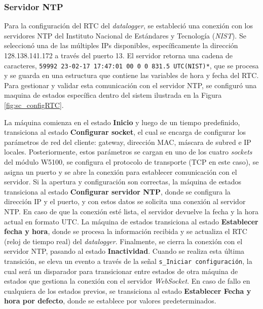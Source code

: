 \subsubsection{Servidor NTP}\label{sec:serverNTP}
Para la configuración del RTC del \textit{datalogger}, se estableció una conexión con los servidores NTP del Instituto Nacional de Estándares y Tecnología (\textit{NIST}). Se seleccionó una de las múltiples IPs disponibles, específicamente la dirección 128.138.141.172 a través del puerto 13. El servidor retorna una cadena de caracteres, \texttt{59992 23-02-17 17:47:01 00 0 0 831.5 UTC(NIST)*}, que se procesa y se guarda en una estructura que contiene las variables de hora y fecha del RTC. Para gestionar y validar esta comunicación con el servidor NTP, se configuró una maquina de estados específica dentro del sistem ilustrada en la Figura \ref{fig:sc_configRTC}.




La máquina comienza en el estado \textbf{Inicio} y luego de un tiempo predefinido, transiciona al estado \textbf{Configurar socket}, el cual se encarga de configurar los parámetros de red del cliente: gateway, dirección MAC, máscara de subred e IP locales. Posteriormente, estos parámetros se cargan en uno de los cuatro \textit{sockets} del módulo W5100, se configura el protocolo de transporte (TCP en este caso), se asigna un puerto y se abre la conexión para establecer comunicación con el servidor. Si la apertura y configuración son correctas, la máquina de estados transiciona al estado \textbf{Configurar servidor NTP}, donde se configura la dirección IP y el puerto, y con estos datos se solicita una conexión al servidor NTP. En caso de que la conexión esté lista, el servidor devuelve la fecha y la hora actual en formato UTC. La máquina de estados transiciona al estado \textbf{Establecer fecha y hora}, donde se procesa la información recibida y se actualiza el RTC (reloj de tiempo real) del \textit{datalogger}. Finalmente, se cierra la conexión con el servidor NTP, pasando al estado \textbf{Inactividad}. Cuando se realiza esta última transición, se eleva un evento a través de la señal \texttt{s\_Iniciar configuración}, la cual será un disparador para transicionar entre estados de otra máquina de estados que gestiona la conexión con el servidor \textit{WebSocket}. En caso de fallo en cualquiera de los estados previos, se transiciona al estado \textbf{Establecer Fecha y hora por defecto}, donde se establece por valores predeterminados.

